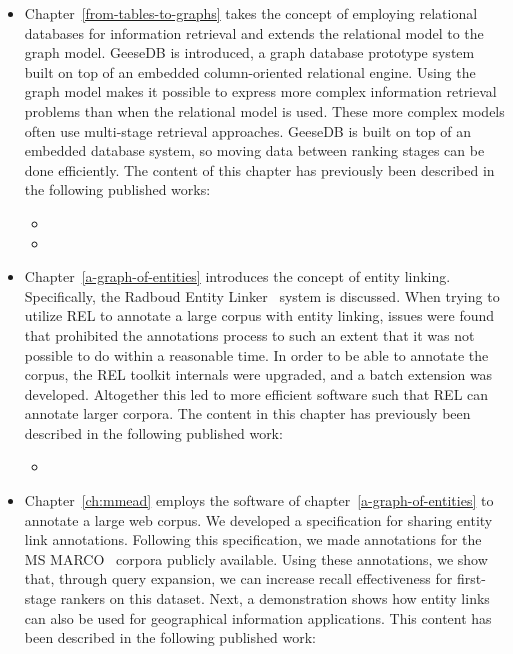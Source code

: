 \begin{itemize}
	\item Chapter~\ref{from-tables-to-graphs} takes the concept of employing relational databases for information retrieval and extends the relational model to the graph model. GeeseDB is introduced, a graph database prototype system built on top of an embedded column-oriented relational engine. Using the graph model makes it possible to express more complex information retrieval problems than when the relational model is used. These more complex models often use multi-stage retrieval approaches. GeeseDB is built on top of an embedded database system, so moving data between ranking stages can be done efficiently. The content of this chapter has previously been described in the following published works:
	
	{
		\scriptsize
		\begin{itemize}
			\item {}
			\item {}
		\end{itemize}
	}
	
	\item Chapter~\ref{a-graph-of-entities} introduces the concept of entity linking. Specifically, the Radboud Entity Linker~\citep{rel} system is discussed. When trying to utilize REL to annotate a large corpus with entity linking, issues were found that prohibited the annotations process to such an extent that it was not possible to do within a reasonable time. In order to be able to annotate the corpus, the REL toolkit internals were upgraded, and a batch extension was developed. Altogether this led to more efficient software such that REL can annotate larger corpora. The content in this chapter has previously been described in the following published work: 
	
	{
		\scriptsize
		\begin{itemize}
			\item {}
		\end{itemize}
	}
	
	\item Chapter~\ref{ch:mmead} employs the software of chapter~\ref{a-graph-of-entities} to annotate a large web corpus. We developed a specification for sharing entity link annotations. Following this specification, we made annotations for the MS MARCO~\citep{msmarco} corpora publicly available. Using these annotations, we show that, through query expansion, we can increase recall effectiveness for first-stage rankers on this dataset. Next, a demonstration shows how entity links can also be used for geographical information applications. 
	This content has been described in the following published work:
	

\end{itemize}
